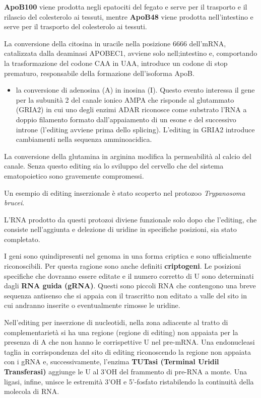 \documentclass[11pt]{book}
\begin{document}
\textbf{ApoB100} viene prodotta negli epatociti del fegato e serve per
il trasporto e il rilascio del colesterolo ai tessuti, mentre
\textbf{ApoB48} viene prodotta nell'intestino e serve per il trasporto
del colesterolo ai tessuti.

La conversione della citosina in uracile nella posizione 6666 dell'mRNA,
catalizzata dalla deaminasi APOBEC1, avviene solo nell;intestino e,
comportando la trasformazione del codone CAA in UAA, introduce un codone
di stop prematuro, responsabile della formazione dell'isoforma ApoB.

\begin{itemize}
\itemsep1pt\parskip0pt
\item
  la conversione di adenosina (A) in inosina (I). Questo evento
  interessa il gene per la subunità 2 del canale ionico AMPA che
  risponde al glutammato (GRIA2) in cui uno degli enzimi ADAR riconosce
  come substrato l'RNA a doppio filamento formato dall'appaiamento di un
  esone e del successivo introne (l'editing avviene prima dello
  splicing). L'editing in GRIA2 introduce cambiamenti nella sequenza
  amminoacidica.
\end{itemize}

La conversione della glutamina in arginina modifica la permeabilità al
calcio del canale. Senza questo editing sia lo sviluppo del cervello che
del sistema ematopoietico sono gravemente compromessi.

Un esempio di editing inserzionale è stato scoperto nel protozoo
\emph{Trypanosoma brucei}.

L'RNA prodotto da questi protozoi diviene funzionale solo dopo che
l'editing, che consiste nell'aggiunta e delezione di uridine in
specifiche posizioni, sia stato completato.

I geni sono quindipresenti nel genoma in una forma criptica e sono
ufficialmente riconoscibili. Per questa ragione sono anche definiti
\textbf{criptogeni}. Le posizioni specifiche che dovranno essere editate
e il numero corretto di U sono determinati dagli \textbf{RNA guida
(gRNA)}. Questi sono piccoli RNA che contengono una breve sequenza
antisenso che si appaia con il trascritto non editato a valle del sito
in cui andranno inserite o eventualmente rimosse le uridine.

Nell'editing per inserzione di nucleotidi, nella zona adiacente al
tratto di complementarietà si ha una regione (regione di editing) non
appaiata per la presenza di A che non hanno le corrispettive U nel
pre-mRNA. Una endonucleasi taglia in corrispondenza del sito di editing
riconoscendo la regione non appaiata con i gRNA e, successivamente,
l'enzima \textbf{TUTasi (Terminal Uridil Transferasi)} aggiunge le U al
3'OH del frammento di pre-RNA a monte. Una ligasi, infine, unisce le
estremità 3'OH e 5'-fosfato ristabilendo la continuità della molecola di
RNA.
\end{document}
